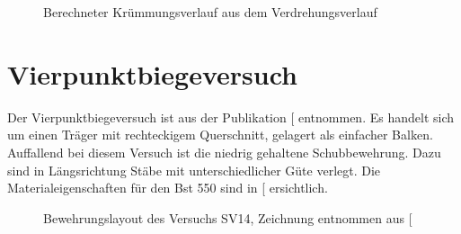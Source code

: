 \documentclass[
  11pt,
  letterpaper,
]{scrreprt}
\begin{document}
\begin{figure}[H]


\caption{\label{fig-chi-max-a3v2}Berechneter Krümmungsverlauf aus dem
Verdrehungsverlauf}

\end{figure}%

\newpage{}

\section{Vierpunktbiegeversuch}\label{vierpunktbiegeversuch}

Der Vierpunktbiegeversuch ist aus der Publikation
{[}\citeproc{ref-tue_einfluss_2019}{3}{]} entnommen. Es handelt sich um
einen Träger mit rechteckigem Querschnitt, gelagert als einfacher
Balken. Auffallend bei diesem Versuch ist die niedrig gehaltene
Schubbewehrung. Dazu sind in Längsrichtung Stäbe mit unterschiedlicher
Güte verlegt. Die Materialeigenschaften für den Bst 550 sind in
{[}\citeproc{ref-marienhutte_produktdatenblatt_b550bpdf_nodate}{4}{]}
ersichtlich.

\begin{figure}[H]


\caption{\label{fig-versuchsskizze-SV14}Bewehrungslayout des Versuchs
SV14, Zeichnung entnommen aus {[}\citeproc{ref-gitz_ansatze_2024}{1}{]}}

\end{figure}%
\end{document}
